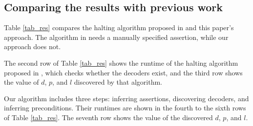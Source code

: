 \documentclass[journal]{IEEEtran}
\begin{document}
\subsection{Comparing the results with previous work}



Table \ref{tab_res} compares the halting algorithm proposed in \cite{ShengYuShen:tcad11} and this paper's approach.
The algorithm in \cite{ShengYuShen:tcad11} needs a manually specified assertion,
while our approach does not.

The second row of Table \ref{tab_res} shows the runtime of
the halting algorithm proposed in \cite{ShengYuShen:tcad11},
which checks whether the decoders exist,
and the third row shows the value of $d$, $p$, and $l$ discovered by that algorithm.

Our algorithm includes three steps:
inferring assertions,
discovering decoders,
and inferring preconditions.
Their runtimes are shown in
the fourth to the sixth rows of Table \ref{tab_res}.
The seventh row shows the value of the discovered $d$, $p$, and $l$.
\end{document}
